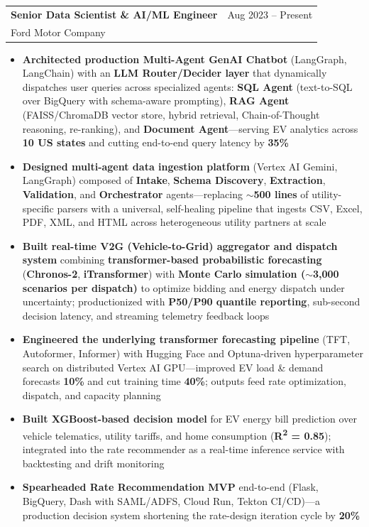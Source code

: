\documentclass[10.5pt,letterpaper]{article}
\makeatletter
\newcommand{\cventry}[5]{%
  \noindent\begin{tabularx}{\textwidth}{@{}X r@{}}
    {\bfseries\color{headerblue}#2} & {\color{graytext}#1} \\
    {\color{accentcolor}#3}\enskip{\color{lightgray}#4} & \\
  \end{tabularx}%
  \vspace{0.02em}%
  #5%
  \vspace{0.12em}%
}
\makeatother
\begin{document}
\cventry{Aug 2023 -- Present}{Senior Data Scientist \& AI/ML Engineer}{Ford Motor Company}{Detroit, MI}{
\begin{itemize}[leftmargin=0.4cm, itemsep=0.02cm, topsep=0.04cm, label={\color{goldaccent}\textbullet}]
  \item \textbf{Architected production Multi-Agent GenAI Chatbot} (LangGraph, LangChain) with an \textbf{LLM Router/Decider layer} that dynamically dispatches user queries across specialized agents: \textbf{SQL Agent} (text-to-SQL over BigQuery with schema-aware prompting), \textbf{RAG Agent} (FAISS/ChromaDB vector store, hybrid retrieval, Chain-of-Thought reasoning, re-ranking), and \textbf{Document Agent}---serving EV analytics across \textbf{10 US states} and cutting end-to-end query latency by \textbf{35\%}
  \item \textbf{Designed multi-agent data ingestion platform} (Vertex AI Gemini, LangGraph) composed of \textbf{Intake}, \textbf{Schema Discovery}, \textbf{Extraction}, \textbf{Validation}, and \textbf{Orchestrator} agents---replacing $\sim$\textbf{500 lines} of utility-specific parsers with a universal, self-healing pipeline that ingests CSV, Excel, PDF, XML, and HTML across heterogeneous utility partners at scale
  \item \textbf{Built real-time V2G (Vehicle-to-Grid) aggregator and dispatch system} combining \textbf{transformer-based probabilistic forecasting} (\textbf{Chronos-2}, \textbf{iTransformer}) with \textbf{Monte Carlo simulation ($\sim$3{,}000 scenarios per dispatch)} to optimize bidding and energy dispatch under uncertainty; productionized with \textbf{P50/P90 quantile reporting}, sub-second decision latency, and streaming telemetry feedback loops
  \item \textbf{Engineered the underlying transformer forecasting pipeline} (TFT, Autoformer, Informer) with Hugging Face and Optuna-driven hyperparameter search on distributed Vertex AI GPU---improved EV load \& demand forecasts \textbf{10\%} and cut training time \textbf{40\%}; outputs feed rate optimization, dispatch, and capacity planning
  \item \textbf{Built XGBoost-based decision model} for EV energy bill prediction over vehicle telematics, utility tariffs, and home consumption (\textbf{R\textsuperscript{2} = 0.85}); integrated into the rate recommender as a real-time inference service with backtesting and drift monitoring
  \item \textbf{Spearheaded Rate Recommendation MVP} end-to-end (Flask, BigQuery, Dash with SAML/ADFS, Cloud Run, Tekton CI/CD)---a production decision system shortening the rate-design iteration cycle by \textbf{20\%}

\end{itemize}}
\end{document}
